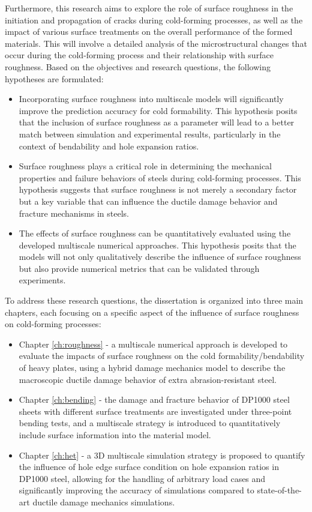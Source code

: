 Furthermore, this research aims to explore the role of surface roughness in the initiation and propagation of cracks during cold-forming processes, as well as the impact of various surface treatments on the overall performance of the formed materials. This will involve a detailed analysis of the microstructural changes that occur during the cold-forming process and their relationship with surface roughness.
Based on the objectives and research questions, the following hypotheses are formulated:
\begin{itemize}
    \item Incorporating surface roughness into multiscale models will significantly improve the prediction accuracy for cold formability. This hypothesis posits that the inclusion of surface roughness as a parameter will lead to a better match between simulation and experimental results, particularly in the context of bendability and hole expansion ratios.
    \item Surface roughness plays a critical role in determining the mechanical properties and failure behaviors of steels during cold-forming processes. This hypothesis suggests that surface roughness is not merely a secondary factor but a key variable that can influence the ductile damage behavior and fracture mechanisms in steels.
    \item The effects of surface roughness can be quantitatively evaluated using the developed multiscale numerical approaches. This hypothesis posits that the models will not only qualitatively describe the influence of surface roughness but also provide numerical metrics that can be validated through experiments.
\end{itemize}
To address these research questions, the dissertation is organized into three main chapters, each focusing on a specific aspect of the influence of surface roughness on cold-forming processes:
\begin{itemize}
    \item Chapter \ref{ch:roughness} - a multiscale numerical approach is developed to evaluate the impacts of surface roughness on the cold formability/bendability of heavy plates, using a hybrid damage mechanics model to describe the macroscopic ductile damage behavior of extra abrasion-resistant steel.
    \item Chapter \ref{ch:bending} - the damage and fracture behavior of DP1000 steel sheets with different surface treatments are investigated under three-point bending tests, and a multiscale strategy is introduced to quantitatively include surface information into the material model.
    \item Chapter \ref{ch:het} - a 3D multiscale simulation strategy is proposed to quantify the influence of hole edge surface condition on hole expansion ratios in DP1000 steel, allowing for the handling of arbitrary load cases and significantly improving the accuracy of simulations compared to state-of-the-art ductile damage mechanics simulations.
\end{itemize}
